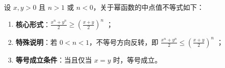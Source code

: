 \begin{statementbox}
设 $x, y > 0$ 且 $n > 1$ 或 $n < 0$，关于幂函数的中点值不等式如下：
\begin{enumerate}
    \item \textbf{核心形式}：$\frac{x^n + y^n}{2} \geqslant \left(\frac{x+y}{2}\right)^n$ ；
    \item \textbf{特殊说明}：若 $0 < n < 1$，不等号方向反转，即 $\frac{x^n + y^n}{2} \leqslant \left(\frac{x+y}{2}\right)^n$ ；
    \item \textbf{等号成立条件}：当且仅当 $x = y$ 时，等号成立。
\end{enumerate}
\end{statementbox}